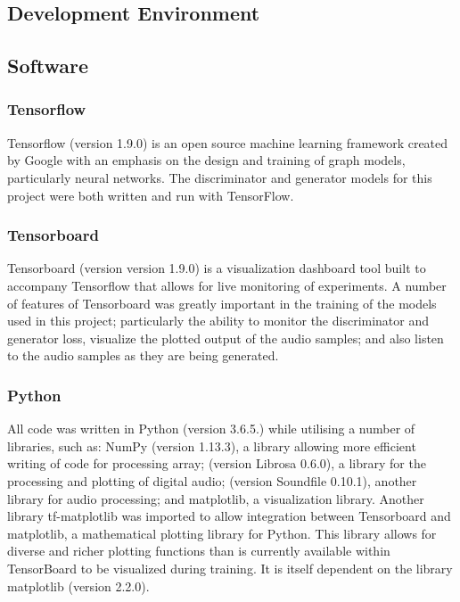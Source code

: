 \documentclass[a4paper, titlepage]{article}
\begin{document}
\newpage

\setlength{\bibhang}{0pt}



\newpage

\begin{appendices}

  \lstset{
    basicstyle=\footnotesize\ttfamily,
    breaklines=true
  }

  \section{Development Environment}

  \subsection{Software}

  \subsubsection{Tensorflow}

  Tensorflow (version 1.9.0) is an open source machine learning framework created by Google with an emphasis on the design and training of graph models, particularly neural networks.
  The discriminator and generator models for this project were both written and run with TensorFlow.

  \subsubsection{Tensorboard}

  Tensorboard (version version 1.9.0) is a visualization dashboard tool built to accompany Tensorflow that allows for live monitoring of experiments.
  A number of features of Tensorboard was greatly important in the training of the models used in this project; particularly the ability to monitor the discriminator and generator loss, visualize the plotted output of the audio samples; and also listen to the audio samples as they are being generated. 

  \subsubsection{Python}

  All code was written in Python (version 3.6.5.) while utilising a number of libraries, such as: NumPy (version 1.13.3), a library allowing more efficient writing of code for processing array; (version Librosa 0.6.0), a library for the processing and plotting of digital audio; (version Soundfile 0.10.1), another library for audio processing; and matplotlib, a visualization library.
  \newline
  \newline
  Another library tf-matplotlib was imported to allow integration between Tensorboard and matplotlib, a mathematical plotting library for Python.
  This library allows for diverse and richer plotting functions than is currently available within TensorBoard to be visualized during training.
  It is itself dependent on the library matplotlib (version 2.2.0).


\end{appendices}
\end{document}
